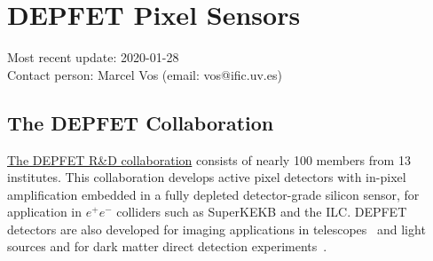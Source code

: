 \section{DEPFET Pixel Sensors}
\label{sec:DEPFET}
Most recent update: 2020-01-28\\
Contact person: Marcel Vos (email: vos@ific.uv.es)

\subsection{The DEPFET Collaboration}
\href{http://www.hll.mpg.de/twiki/bin/view/DEPFET/CollaborationList}{The DEPFET R\&D collaboration} consists of nearly 100 members from 13 institutes. This collaboration develops active pixel detectors with in-pixel amplification embedded in a fully depleted detector-grade silicon sensor, for application in $e^+e^-$ colliders such as SuperKEKB and the ILC. DEPFET detectors are also developed for imaging applications in telescopes~\cite{Baehr:2018zbc,Treberspurg:2018nwm} and light sources and for dark matter direct detection experiments~\cite{Baehr:2017lmu}.

